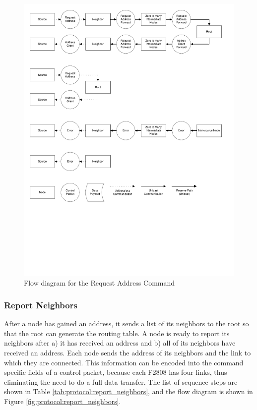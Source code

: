 \begin{figure}[ptb]
	\begin{centering}
		\includegraphics[scale=0.75]{Protocol/Figures/protocol-request_address.pdf}
		\caption{Flow diagram for the Request Address Command}
		\label{fig:protocol:request_address}
	\end{centering}
\end{figure}

\subsubsection{Report Neighbors}\label{ref:protocol:methodology:commands:report_neighbors}

After a node has gained an address, it sends a list of its neighbors to the root so that the root can generate the routing table. A node is ready to report its neighbors after a) it has received an address and b) all of its neighbors have received an address. Each node sends the address of its neighbors and the link to which they are connected. This information can be encoded into the command specific fields of a control packet, because each F2808 has four links, thus eliminating the need to do a full data transfer. The list of sequence steps are shown in Table \ref{tab:protocol:report_neighbors}, and the flow diagram is shown in Figure \ref{fig:protocol:report_neighbors}.

